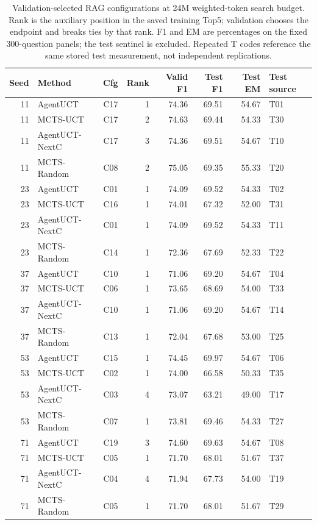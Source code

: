 \begin{table}[p]
\centering
\small
\setlength{\tabcolsep}{4pt}
\caption{Validation-selected RAG configurations at 24M weighted-token search budget. Rank is the auxiliary position in the saved training Top5; validation chooses the endpoint and breaks ties by that rank. F1 and EM are percentages on the fixed 300-question panels; the test sentinel is excluded. Repeated T codes reference the same stored test measurement, not independent replications.}
\label{tab:rag-best-configs-24m}
\begin{tabular}{@{}rlrrrrrl@{}}
\toprule
Seed & Method & Cfg & Rank & Valid F1 & Test F1 & Test EM & Test source \\
\midrule
11 & AgentUCT & C17 & 1 & 74.36 & 69.51 & 54.67 & T01 \\
11 & MCTS-UCT & C17 & 2 & 74.63 & 69.44 & 54.33 & T30 \\
11 & AgentUCT-NextC & C17 & 3 & 74.36 & 69.51 & 54.67 & T10 \\
11 & MCTS-Random & C08 & 2 & 75.05 & 69.35 & 55.33 & T20 \\
23 & AgentUCT & C01 & 1 & 74.09 & 69.52 & 54.33 & T02 \\
23 & MCTS-UCT & C16 & 1 & 74.01 & 67.32 & 52.00 & T31 \\
23 & AgentUCT-NextC & C01 & 1 & 74.09 & 69.52 & 54.33 & T11 \\
23 & MCTS-Random & C14 & 1 & 72.36 & 67.69 & 52.33 & T22 \\
37 & AgentUCT & C10 & 1 & 71.06 & 69.20 & 54.67 & T04 \\
37 & MCTS-UCT & C06 & 1 & 73.65 & 68.69 & 54.00 & T33 \\
37 & AgentUCT-NextC & C10 & 1 & 71.06 & 69.20 & 54.67 & T14 \\
37 & MCTS-Random & C13 & 1 & 72.04 & 67.68 & 53.00 & T25 \\
53 & AgentUCT & C15 & 1 & 74.45 & 69.97 & 54.67 & T06 \\
53 & MCTS-UCT & C02 & 1 & 74.00 & 66.58 & 50.33 & T35 \\
53 & AgentUCT-NextC & C03 & 4 & 73.07 & 63.21 & 49.00 & T17 \\
53 & MCTS-Random & C07 & 1 & 73.81 & 69.46 & 54.33 & T27 \\
71 & AgentUCT & C19 & 3 & 74.60 & 69.63 & 54.67 & T08 \\
71 & MCTS-UCT & C05 & 1 & 71.70 & 68.01 & 51.67 & T37 \\
71 & AgentUCT-NextC & C04 & 4 & 71.94 & 67.73 & 54.00 & T19 \\
71 & MCTS-Random & C05 & 1 & 71.70 & 68.01 & 51.67 & T29 \\
\bottomrule
\end{tabular}
\end{table}
